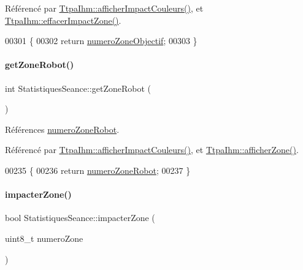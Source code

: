 Référencé par \hyperlink{class_ttpa_ihm_a6e3cd3828ce5d165497e343bdb15cd87}{Ttpa\+Ihm\+::afficher\+Impact\+Couleurs()}, et \hyperlink{class_ttpa_ihm_abe9973c64673cdaa067617f9246781d2}{Ttpa\+Ihm\+::effacer\+Impact\+Zone()}.


\begin{DoxyCode}
00301 \{
00302     \textcolor{keywordflow}{return} \hyperlink{class_statistiques_seance_a23226867e4a34cb41f8c07f3d8d42e49}{numeroZoneObjectif};
00303 \}
\end{DoxyCode}
\mbox{\label{class_statistiques_seance_ad1bdc22fbd9f37fab06d9fc24e9f1bc4}} 
\paragraph{\texorpdfstring{get\+Zone\+Robot()}{getZoneRobot()}}
{\footnotesize\ttfamily int Statistiques\+Seance\+::get\+Zone\+Robot (\begin{DoxyParamCaption}{ }\end{DoxyParamCaption})}



Références \hyperlink{class_statistiques_seance_aeea50e7fc9b2308e365f77f27e3f86ee}{numero\+Zone\+Robot}.



Référencé par \hyperlink{class_ttpa_ihm_a6e3cd3828ce5d165497e343bdb15cd87}{Ttpa\+Ihm\+::afficher\+Impact\+Couleurs()}, et \hyperlink{class_ttpa_ihm_a3b00f90707811240c7dcfe8ed3dce783}{Ttpa\+Ihm\+::afficher\+Zone()}.


\begin{DoxyCode}
00235 \{
00236     \textcolor{keywordflow}{return} \hyperlink{class_statistiques_seance_aeea50e7fc9b2308e365f77f27e3f86ee}{numeroZoneRobot};
00237 \}
\end{DoxyCode}
\mbox{\label{class_statistiques_seance_adf93738ca1b6b117ac91b68772d2c4c8}} 
\paragraph{\texorpdfstring{impacter\+Zone()}{impacterZone()}}
{\footnotesize\ttfamily bool Statistiques\+Seance\+::impacter\+Zone (\begin{DoxyParamCaption}\item[{uint8\+\_\+t}]{numero\+Zone }\end{DoxyParamCaption})}


